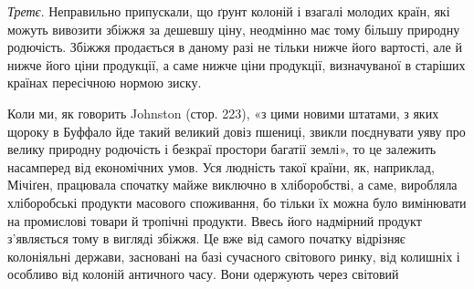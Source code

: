 \emph{Третє}. Неправильно припускали, що ґрунт колоній і взагалі молодих
країн, які можуть вивозити збіжжя за дешевшу ціну, неодмінно має тому більшу
природну родючість. Збіжжя продається в даному разі не тільки нижче його
вартості, але й нижче його ціни продукції, а саме нижче ціни продукції, визначуваної
в старіших країнах пересічною нормою зиску.

Коли ми, як говорить Johnston (стор. 223), «з цими новими штатами, з
яких щороку в Буффало йде такий великий довіз пшениці, звикли поєднувати
уяву про велику природну родючість і безкраї простори багатії землі», то це
залежить насамперед від економічних умов. Уся людність такої країни, як, наприклад,
Мічіґен, працювала спочатку майже виключно в хліборобстві, а саме,
виробляла хліборобські продукти масового споживання, бо тільки їх можна було
вимінювати на промислові товари й тропічні продукти. Ввесь його надмірний продукт
з’являється тому в вигляді збіжжя. Це вже від самого початку відрізняє
колоніяльні держави, засновані на базі сучасного світового ринку, від
колишніх і особливо від колоній античного часу. Вони одержують через світовий
\parbreak{}  %
